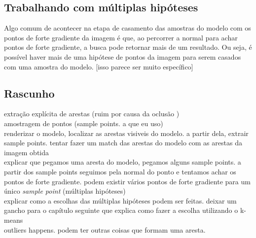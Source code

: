 \subsection{Trabalhando com múltiplas hipóteses}

Algo comum de acontecer na etapa de casamento das amostras do modelo com os pontos de forte gradiente da imagem é que, ao percorrer a normal para achar pontos de forte gradiente, a busca pode retornar mais de um resultado. Ou seja, é possível haver mais de uma hipótese de pontos da imagem para serem casados com uma amostra do modelo. [isso parece ser muito específico]

\subsection{Rascunho}

extração explícita de arestas (ruim por causa da oclusão \cite{drummondecipolla}) \\
amostragem de pontos (sample points. a que eu uso) \\

renderizar o modelo, localizar as arestas visiveis do modelo. a partir dela, extrair sample points. tentar fazer um match das arestas do modelo com as arestas da imagem obtida\cite{drummondecipolla} \\
explicar que pegamos uma aresta do modelo, pegamos alguns sample points. a partir dos sample points seguimos pela normal do ponto e tentamos achar os pontos de forte gradiente. podem existir vários pontos de forte gradiente para um único \emph{sample point} (múltiplas hipóteses) \\

explicar como a escolhas das múltiplas hipóteses podem ser feitas. deixar um gancho para o capítulo seguinte que explica como fazer a escolha utilizando o k-means \\

outliers happens. podem ter outras coisas que formam uma aresta. \\

